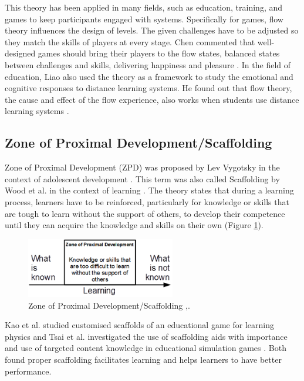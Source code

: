 \documentclass[12pt, a4paper]{report}
\begin{document}
This theory has been applied in many fields, such as education, training, and games to keep participants engaged with systems. Specifically for games, flow theory influences the design of levels. The given challenges have to be adjusted so they match the skills of players at every stage. Chen commented that well-designed games should bring their players to the flow states, balanced states between challenges and skills, delivering happiness and pleasure \cite{chen2007flow}. In the field of education, Liao also used the theory as a framework to study the emotional and cognitive responses to distance learning systems. He found out that flow theory, the cause and effect of the flow experience, also works when students use distance learning systems \cite{liao2006flow}.

\subsection{Zone of Proximal Development/Scaffolding}
Zone of Proximal Development (ZPD) was proposed by Lev Vygotsky in the context of adolescent development \cite{vygotsky1978mind}. This term was also called Scaffolding by Wood et al. in the context of learning \cite{wood1976role}. The theory states that during a learning process, learners have to be reinforced, particularly for knowledge or skills that are tough to learn without the support of others, to develop their competence until they can acquire the knowledge and skills on their own (Figure \ref{scaffolding}). 

\begin{figure}[ht]
\centering
\includegraphics[width=6.5cm]{scaffolding}
\caption{Zone of Proximal Development/Scaffolding \cite{vygotsky1978mind},\cite{wood1976role}.}
\label{scaffolding}
\end{figure}

Kao et al. studied customised scaffolds of an educational game for learning physics \cite{kao2015designing} and Tsai et al. investigated the use of scaffolding aids with importance and use of targeted content knowledge in educational simulation games \cite{tsai2013importance}. Both found proper scaffolding facilitates learning and helps learners to have better performance. 
\end{document}
